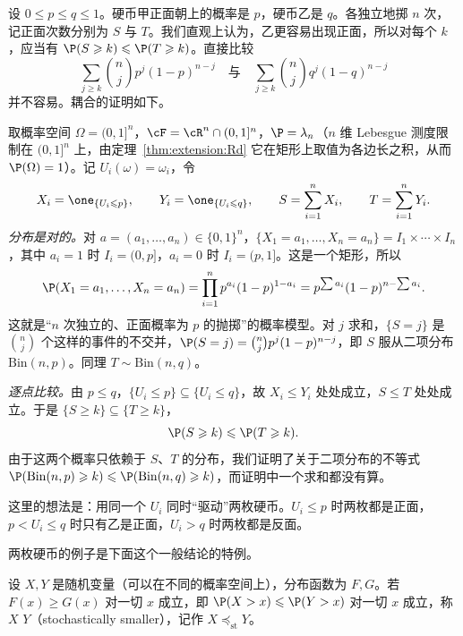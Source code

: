 \begin{example}[两枚硬币]\label{ex:distributions:two-coins}
设 $0\leqslant p\leqslant q\leqslant1$。硬币甲正面朝上的概率是 $p$，硬币乙是 $q$。各独立地掷 $n$ 次，记正面次数分别为 $S$ 与 $T$。我们直观上认为，乙更容易出现正面，所以对每个 $k$，应当有 $\P(S\geqslant k)\leqslant \P(T\geqslant k)$。直接比较
\[
\sum_{j\geqslant k}\binom njp^j(1-p)^{n-j}\quad\text{与}\quad\sum_{j\geqslant k}\binom njq^j(1-q)^{n-j}
\]
并不容易。耦合的证明如下。

取概率空间 $\Omega=(0,1]^n$，$\cF=\cR^n\cap(0,1]^n$，$\P=\lambda_n$（$n$ 维 Lebesgue 测度限制在 $(0,1]^n$ 上，由定理~\ref{thm:extension:Rd} 它在矩形上取值为各边长之积，从而 $\P(\Omega)=1$）。记 $U_i(\omega)=\omega_i$，令
\[
X_i=\one_{\{U_i\leqslant p\}},\qquad Y_i=\one_{\{U_i\leqslant q\}},\qquad S=\sum_{i=1}^nX_i,\qquad T=\sum_{i=1}^nY_i.
\]
\emph{分布是对的。}对 $a=(a_1,\dots,a_n)\in\{0,1\}^n$，$\{X_1=a_1,\dots,X_n=a_n\}=I_1\times\cdots\times I_n$，其中 $a_i=1$ 时 $I_i=(0,p]$，$a_i=0$ 时 $I_i=(p,1]$。这是一个矩形，所以
\[
\P(X_1=a_1,\dots,X_n=a_n)=\prod_{i=1}^np^{a_i}(1-p)^{1-a_i}=p^{\sum a_i}(1-p)^{n-\sum a_i}.
\]
这就是“$n$ 次独立的、正面概率为 $p$ 的抛掷”的概率模型。对 $j$ 求和，$\{S=j\}$ 是 $\binom nj$ 个这样的事件的不交并，$\P(S=j)=\binom njp^j(1-p)^{n-j}$，即 $S$ 服从二项分布 $\mathrm{Bin}(n,p)$。同理 $T\sim\mathrm{Bin}(n,q)$。

\emph{逐点比较。}由 $p\leqslant q$，$\{U_i\leqslant p\}\subseteq\{U_i\leqslant q\}$，故 $X_i\leqslant Y_i$ 处处成立，$S\leqslant T$ 处处成立。于是 $\{S\geqslant k\}\subseteq\{T\geqslant k\}$，
\[
\P(S\geqslant k)\leqslant \P(T\geqslant k).
\]
由于这两个概率只依赖于 $S$、$T$ 的分布，我们证明了关于二项分布的不等式 $\P(\mathrm{Bin}(n,p)\geqslant k)\leqslant \P(\mathrm{Bin}(n,q)\geqslant k)$，而证明中一个求和都没有算。

这里的想法是：用同一个 $U_i$ 同时“驱动”两枚硬币。$U_i\leqslant p$ 时两枚都是正面，$p<U_i\leqslant q$ 时只有乙是正面，$U_i>q$ 时两枚都是反面。
\end{example}

两枚硬币的例子是下面这个一般结论的特例。

\begin{definition}[随机序]\label{def:distributions:stochastic-order}
设 $X,Y$ 是随机变量（可以在不同的概率空间上），分布函数为 $F,G$。若 $F(x)\geqslant G(x)$ 对一切 $x$ 成立，即 $\P(X>x)\leqslant \P(Y>x)$ 对一切 $x$ 成立，称 $X$  $Y$（stochastically smaller），记作 $X\preceq_{\mathrm{st}}Y$。
\end{definition}

